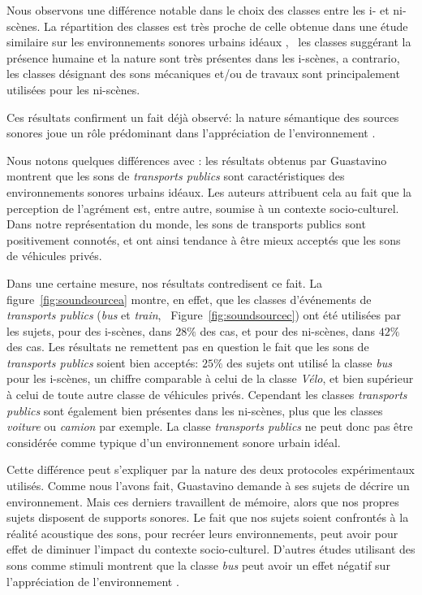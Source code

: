 \documentclass[twoside,twocolumn]{article}
\begin{document}
Nous observons une différence notable dans le choix des classes entre les i- et ni-scènes. La répartition des classes est très proche de celle obtenue dans une étude similaire sur les environnements sonores urbains idéaux \cite{guastavino2006ideal}, \ie~les classes suggérant la présence humaine et la nature sont très présentes dans les i-scènes, a contrario, les classes désignant des sons mécaniques et/ou de travaux sont principalement utilisées pour les ni-scènes.

Ces résultats confirment un fait déjà observé: la nature sémantique des sources sonores joue un rôle prédominant dans l'appréciation de l'environnement \cite{raimbault2005urban,dubois2006cognitive}.

Nous notons quelques différences avec \cite{guastavino2006ideal}: les résultats obtenus par Guastavino montrent que les sons de \emph{transports publics} sont caractéristiques des environnements sonores urbains idéaux. Les auteurs attribuent cela au fait que la perception de l'agrément est, entre autre, soumise à un contexte socio-culturel. Dans notre représentation du monde, les sons de transports publics sont positivement connotés, et ont ainsi tendance à être mieux acceptés que les sons de véhicules privés.

Dans une certaine mesure, nos résultats contredisent ce fait. La figure~\ref{fig:soundsourcea} montre, en effet, que les classes d'événements de \emph{transports publics} (\emph{bus} et \emph{train}, \cf~Figure~\ref{fig:soundsourcec}) ont été utilisées par les sujets, pour des i-scènes, dans $28\%$ des cas, et pour des ni-scènes, dans $42\%$ des cas. Les résultats ne remettent pas en question le fait que les sons de \emph{transports publics} soient bien acceptés: $25\%$ des sujets ont utilisé la classe \emph{bus} pour les i-scènes, un chiffre comparable à celui de la classe \emph{Vélo}, et bien supérieur à celui de toute autre classe de véhicules privés. Cependant les classes \emph{transports publics} sont également bien présentes dans les ni-scènes, plus que les classes \emph{voiture} ou \emph{camion} par exemple. La classe \emph{transports publics} ne peut donc pas être considérée comme typique d'un environnement sonore urbain idéal.

Cette différence peut s'expliquer par la nature des deux protocoles expérimentaux utilisés. Comme nous l'avons fait, Guastavino demande à ses sujets de décrire un environnement. Mais ces derniers travaillent de mémoire, alors que nos propres sujets disposent de supports sonores. Le fait que nos sujets soient confrontés à la réalité acoustique des sons, pour recréer leurs environnements, peut avoir pour effet de diminuer l'impact du contexte socio-culturel. D'autres études utilisant des sons comme stimuli montrent que la classe \emph{bus} peut avoir un effet négatif sur l'appréciation de l'environnement \cite{lavandier2006contribution}.
\end{document}
